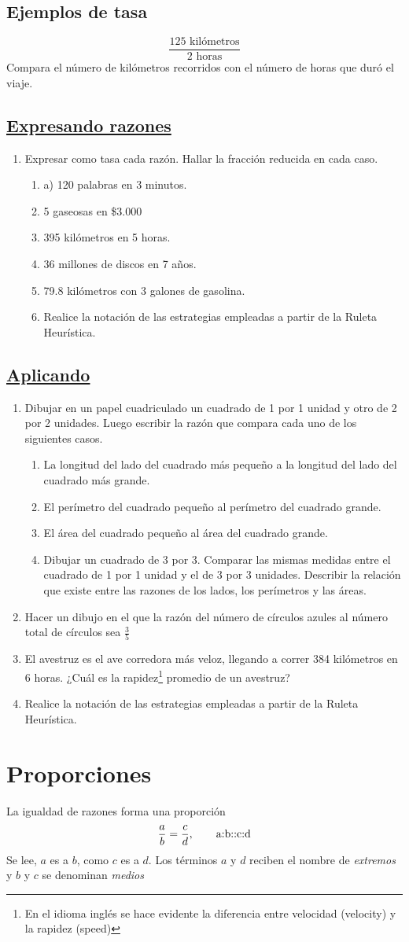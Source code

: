 \documentclass[10pt,twoside]{article}
\begin{document}
\subsection*{Ejemplos de tasa}
\[\dfrac{125\text{ kil\'{o}metros}}{2\text{ horas}}\] Compara el n\'{u}mero de kil\'{o}metros recorridos con el n\'{u}mero de horas que dur\'{o} el viaje.
\subsection*{\underline{Expresando razones}}
\begin{enumerate}
\item Expresar como tasa cada razón. Hallar la fracción reducida en cada caso.
\begin{enumerate}
\item a) 120 palabras en 3 minutos.
\item 5 gaseosas en \$3.000
\item 395 kilómetros en 5 horas.
\item 36 millones de discos en 7 años.
\item 79.8 kilómetros con 3 galones de gasolina.
\item Realice la notación de las estrategias empleadas a partir de la Ruleta Heurística.
\end{enumerate}
\end{enumerate}
\subsection*{\underline{Aplicando}}
\begin{enumerate}
\item Dibujar en un papel cuadriculado un cuadrado de 1 por 1 unidad y otro de 2 por 2 unidades. Luego escribir la razón que compara cada  uno de los siguientes casos.
\begin{enumerate}
\item La longitud del lado del cuadrado más pequeño a la longitud del lado del cuadrado más grande.
\item El perímetro del cuadrado pequeño al perímetro del cuadrado grande.
\item El área del cuadrado pequeño al área del cuadrado grande.
\item Dibujar un cuadrado de 3 por 3. Comparar las mismas medidas entre el cuadrado de 1 por 1 unidad y el de 3 por 3 unidades.  Describir la relación que existe entre las razones de los lados, los perímetros y las áreas.
\end{enumerate}
\item Hacer un dibujo en el que la razón del número de círculos azules al número total de círculos sea $\frac{3}{5}$
\item El avestruz es el ave corredora más veloz, llegando a correr 384 kilómetros en 6 horas. ¿Cuál es la rapidez\footnote{En el idioma inglés se hace evidente la diferencia entre velocidad (velocity) y la rapidez (speed)} promedio de un avestruz?
\item Realice la notación de las estrategias empleadas a partir de la Ruleta Heurística.
\end{enumerate}
\section*{Proporciones}
La igualdad de razones forma una proporción
\[\dfrac{a}{b}=\dfrac{c}{d}, \text{\qquad a:b::c:d}\]
Se lee, $a$ es a $b$, como $c$ es a $d$. Los términos $a$ y $d$ reciben el nombre de \emph{extremos} y $b$ y $c$ se denominan \emph{medios}
\end{document}
